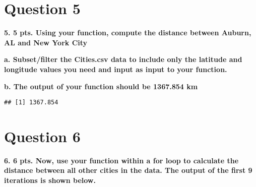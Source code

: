 \documentclass[
]{article}
\newenvironment{Shaded}{\begin{snugshade}}{\end{snugshade}}
\newcommand{\CommentTok}[1]{\textcolor[rgb]{0.56,0.35,0.01}{\textit{#1}}}
\newcommand{\FunctionTok}[1]{\textcolor[rgb]{0.13,0.29,0.53}{\textbf{#1}}}
\newcommand{\NormalTok}[1]{#1}
\newcommand{\OtherTok}[1]{\textcolor[rgb]{0.56,0.35,0.01}{#1}}
\newcommand{\SpecialCharTok}[1]{\textcolor[rgb]{0.81,0.36,0.00}{\textbf{#1}}}
\newcommand{\StringTok}[1]{\textcolor[rgb]{0.31,0.60,0.02}{#1}}
\begin{document}
\section{Question 5}\label{question-5}

\textbf{5. 5 pts. Using your function, compute the distance between
Auburn, AL and New York City }

\textbf{a. Subset/filter the Cities.csv data to include only the
latitude and longitude values you need and input as input to your
function.}

\textbf{b. The output of your function should be 1367.854 km}

\begin{Shaded}
\end{Shaded}

\begin{verbatim}
## [1] 1367.854
\end{verbatim}

\section{Question 6}\label{question-6}

\textbf{6. 6 pts. Now, use your function within a for loop to calculate
the distance between all other cities in the data. The output of the
first 9 iterations is shown below. }
\end{document}

